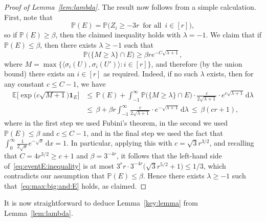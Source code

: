 \documentclass[12pt,reqno]{amsart}
\theoremstyle{definition}
\theoremstyle{remark}
\def\Pr{\mathbb{P}}
\newcommand\Ex{\mathbb{E}}
\renewcommand{\le}{\leqslant}
\renewcommand{\ge}{\geqslant}
\begin{document}
\begin{proof}[Proof of Lemma~\ref{lem:lambda}]
The result now follows from a simple calculation. First, note that 
$$\Pr(E) = \Pr\Big( Z_i \ge - 3r \, \text{ for all } \, i \in [r] \Big),$$
so if $\Pr(E) \ge \beta$, then the claimed inequality holds with $\lambda = -1$. We claim that if $\Pr(E) \le \beta$, then there exists $\lambda \ge -1$ such that
\begin{equation}\label{eq:max:big:and:E}
 \Pr\Big( \big\{ M \ge \lambda \big\} \cap E \Big) \ge \beta r e^{-C\sqrt{\lambda + 1}},
\end{equation}
where $M = \max \big\{ \big\langle \sigma_i(U),\sigma_i(U') \big\rangle : i \in [r] \big\}$, 
and therefore (by the union bound) there exists an $i \in [r]$ as required. Indeed, if no such $\lambda$ exists, then for any constant $c \le C - 1$, we have
\begin{align*}
\Ex\Big[ \exp\big( c \sqrt{M + 1} \big) \mathbf{1}_E \Big]
& \le \, \Pr(E) + \int_{-1}^\infty \Pr\Big( \big\{ M \ge \lambda \big\} \cap E \Big) \cdot \frac{c}{2\sqrt{\lambda + 1}} \cdot e^{c \sqrt{\lambda + 1}} \,\mathrm{d}\lambda\\
& \le \, \beta + \beta r \int_{-1}^\infty \frac{c}{2\sqrt{\lambda + 1}} \cdot e^{- \sqrt{\lambda + 1}} \,\mathrm{d}\lambda \, \le \, \beta (cr + 1),
\end{align*}
where in the first step we used Fubini's theorem, in the second we used $\Pr(E) \le \beta$ and $c \le C - 1$, and in the final step we used the fact that $\int_0^\infty \frac{1}{2\sqrt{x}} e^{-\sqrt{x}} \, \mathrm{d}x = 1$. In particular, applying this with $c = \sqrt{3}r^{3/2}$, and recalling that $C = 4r^{3/2} \ge c + 1$ and $\beta = 3^{-4r}$, it follows that the left-hand side of~\eqref{eq:eventE:inequality} is at most $3^r r \cdot 3^{-4r} \big( \sqrt{3}r^{5/2} + 1 \big) \le 1/3$, which contradicts our assumption that $\Pr(E) \le \beta$. Hence there exists $\lambda \ge -1$ such that~\eqref{eq:max:big:and:E} holds, as claimed.
\end{proof}

It is now straightforward to deduce Lemma~\ref{key:lemma} from Lemma~\ref{lem:lambda}. 

\end{document}
